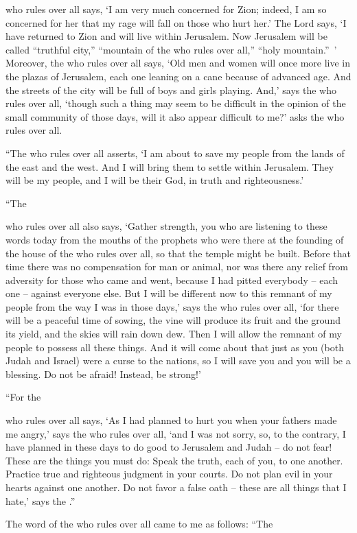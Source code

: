 {{}
who rules over all
says, ‘I am very much
concerned for Zion;
indeed, I am so concerned
for her that my rage
will fall
on those who hurt her.’
The Lord
says,
‘I have returned
to
Zion
and will live
within
Jerusalem.
Now Jerusalem
will be called
“truthful
city,”
“mountain
of the {}
who rules over all,”
“holy
mountain.” ’
Moreover,
the {}
who rules over all
says,
‘Old men
and women
will once more
live
in the plazas
of Jerusalem,
each
one leaning
on a cane
because of advanced
age.
And the streets
of the city
will
be full
of boys
and girls
playing.
And,’ says
the
{}
who rules over all,
‘though
such a thing may seem
to be difficult
in
the opinion
of the small community of those
days,
will it also
appear difficult
to me?’ asks
the
{}
who rules over all.
\par }{\PP {}“The
{}
who rules over all
asserts,
‘I am about to save
my people
from the lands
of the east
and the west.
And I will bring
them
to settle
within
Jerusalem.
They will be
my people,
and I
will be
their God,
in truth
and righteousness.’
\par }{\PP {}“The

{}
who rules over all
also says, ‘Gather strength,
you who are
listening
to these
words
today
from the mouths
of the prophets
who
were
there at
the founding
of the house
of the {}
who rules over all,
so that the temple
might be built.
Before
that
time
there was
no
compensation
for man
or animal,
nor
was there any relief from adversity
for those who came
and went,
because I had pitted
everybody
– each one – against everyone else.
But I will be different
now
to this
remnant
of my people
from the way
I
was in those days,’
says
the {}
who rules over all,
‘for
there
will be
a peaceful
time of sowing,
the vine
will produce
its fruit
and the ground
its yield,
and the skies
will
rain down dew.
Then I will allow
the
remnant
of my people
to possess all
these things.
And it will
come about that just
as you (both Judah
and Israel) were a curse
to the nations,
so
I will save
you and you will be
a blessing.
Do not
be afraid! Instead, be strong!’
\par }{\PP {}“For
the

{}
who rules over all
says, ‘As I had
planned
to hurt
you when your fathers
made me angry,’
says
the {}
who rules over all,
‘and I was not
sorry,
so,
to the contrary, I have planned
in these
days
to do good
to Jerusalem
and Judah
– do not
fear!
These
are the things
you must do: Speak
the truth,
each
of you,
to one another.
Practice
true
and righteous
judgment
in your courts.
Do not
plan
evil
in your hearts
against one another.
Do not
favor
a false
oath
– these
are all
things that
I hate,’
says
the {}.”
\par }{\PP {}The word
of the {}
who rules over all
came
to
me as follows:
“The

}
